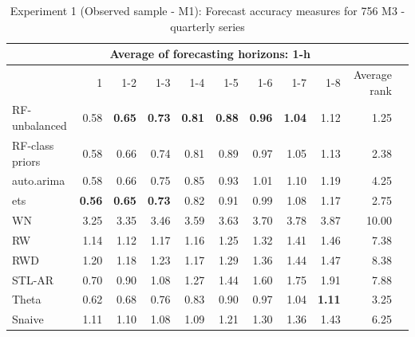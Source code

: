 \documentclass[11pt,a4paper,]{article}
\theoremstyle{definition}
\theoremstyle{definition}
\theoremstyle{definition}
\theoremstyle{remark}
\begin{document}
\begin{table}[!h]
\centering
\caption{Experiment 1 (Observed sample - M1): Forecast accuracy measures for 756 M3 - quarterly series}
\label{M3Q}
\begin{tabular}{lrrrrrrrrrl}
\hline
 & \multicolumn{8}{c|}{Average of forecasting horizons: 1-h}    &  \\ \hline
 &  1& 1-2 & 1-3 & 1-4 & 1-5 & 1-6 & 1-7 & 1-8  & Average rank  \\ \hline
RF-unbalanced& 0.58 & \bf{0.65} & \bf{0.73} & \bf{0.81} & \bf{0.88} & \bf{0.96} & \bf{1.04} & 1.12 & 1.25  \\ 
RF-class priors & 0.58&  0.66& 0.74 & 0.81 & 0.89 & 0.97 & 1.05 & 1.13   & 2.38   \\ 
auto.arima & 0.58 & 0.66  & 0.75 & 0.85 & 0.93 & 1.01 & 1.10 & 1.19 & 4.25 \\ 
ets & \bf{0.56} & \bf{0.65}  & \bf{0.73} & 0.82 & 0.91 & 0.99 & 1.08 & 1.17 & 2.75   \\ 
WN & 3.25 & 3.35 & 3.46 & 3.59 & 3.63 & 3.70 & 3.78 & 3.87 & 10.00   \\ 
RW & 1.14 & 1.12 & 1.17 & 1.16 & 1.25 & 1.32 & 1.41 & 1.46 &  7.38  \\ 
RWD & 1.20 & 1.18 & 1.23 & 1.17 & 1.29 & 1.36 & 1.44 & 1.47 & 8.38   \\ 
STL-AR & 0.70 & 0.90 & 1.08 & 1.27 & 1.44 & 1.60 & 1.75 &  1.91 & 7.88   \\ 
Theta & 0.62 & 0.68 & 0.76 & 0.83 & 0.90 & 0.97 & 1.04 &  \bf{1.11} & 3.25  \\ 
Snaive & 1.11 & 1.10 & 1.08 & 1.09 & 1.21 & 1.30 & 1.36 & 1.43 &  6.25  \\ \hline
\end{tabular}
\end{table}
\end{document}
